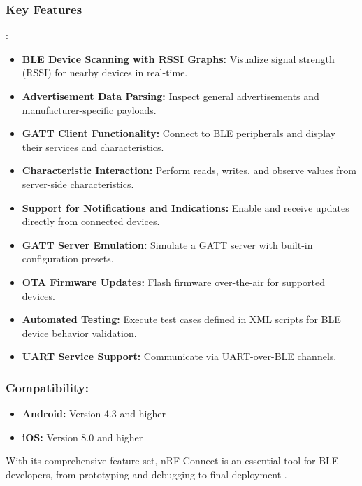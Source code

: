 \subsubsection{Key Features} \cite{buildingBLEsystems}:
\begin{itemize}
    \item \textbf{BLE Device Scanning with RSSI Graphs:} Visualize signal strength (RSSI) for nearby devices in real-time.
    \item \textbf{Advertisement Data Parsing:} Inspect general advertisements and manufacturer-specific payloads.
    \item \textbf{GATT Client Functionality:} Connect to BLE peripherals and display their services and characteristics.
    \item \textbf{Characteristic Interaction:} Perform reads, writes, and observe values from server-side characteristics.
    \item \textbf{Support for Notifications and Indications:} Enable and receive updates directly from connected devices.
    \item \textbf{GATT Server Emulation:} Simulate a GATT server with built-in configuration presets.
    \item \textbf{OTA Firmware Updates:} Flash firmware over-the-air for supported devices.
    \item \textbf{Automated Testing:} Execute test cases defined in XML scripts for BLE device behavior validation.
    \item \textbf{UART Service Support:} Communicate via UART-over-BLE channels.
\end{itemize}

\subsubsection{Compatibility:}
\begin{itemize}
    \item \textbf{Android:} Version 4.3 and higher
    \item \textbf{iOS:} Version 8.0 and higher
\end{itemize}

With its comprehensive feature set, nRF Connect is an essential tool for BLE developers, from prototyping and debugging to final deployment \cite{buildingBLEsystems}.


